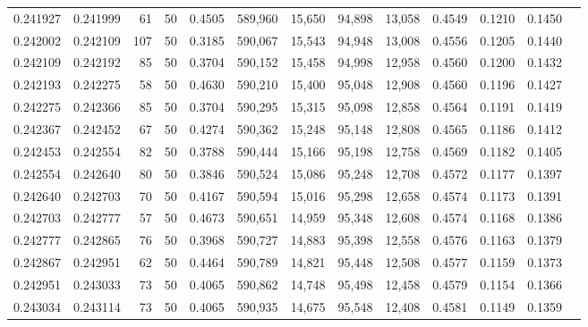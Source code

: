 \begin{tabular}{rrrrrrrrrrrrr}
0.241927 & 0.241999 &    61 &  50 &                                     0.4505 & 589,960 &  15,650 &  94,898 &  13,058 & 0.4549 & 0.1210 & 0.1450 \\
0.242002 & 0.242109 &   107 &  50 &                                     0.3185 & 590,067 &  15,543 &  94,948 &  13,008 & 0.4556 & 0.1205 & 0.1440 \\
0.242109 & 0.242192 &    85 &  50 &                                     0.3704 & 590,152 &  15,458 &  94,998 &  12,958 & 0.4560 & 0.1200 & 0.1432 \\
0.242193 & 0.242275 &    58 &  50 &                                     0.4630 & 590,210 &  15,400 &  95,048 &  12,908 & 0.4560 & 0.1196 & 0.1427 \\
0.242275 & 0.242366 &    85 &  50 &                                     0.3704 & 590,295 &  15,315 &  95,098 &  12,858 & 0.4564 & 0.1191 & 0.1419 \\
0.242367 & 0.242452 &    67 &  50 &                                     0.4274 & 590,362 &  15,248 &  95,148 &  12,808 & 0.4565 & 0.1186 & 0.1412 \\
0.242453 & 0.242554 &    82 &  50 &                                     0.3788 & 590,444 &  15,166 &  95,198 &  12,758 & 0.4569 & 0.1182 & 0.1405 \\
0.242554 & 0.242640 &    80 &  50 &                                     0.3846 & 590,524 &  15,086 &  95,248 &  12,708 & 0.4572 & 0.1177 & 0.1397 \\
0.242640 & 0.242703 &    70 &  50 &                                     0.4167 & 590,594 &  15,016 &  95,298 &  12,658 & 0.4574 & 0.1173 & 0.1391 \\
0.242703 & 0.242777 &    57 &  50 &                                     0.4673 & 590,651 &  14,959 &  95,348 &  12,608 & 0.4574 & 0.1168 & 0.1386 \\
0.242777 & 0.242865 &    76 &  50 &                                     0.3968 & 590,727 &  14,883 &  95,398 &  12,558 & 0.4576 & 0.1163 & 0.1379 \\
0.242867 & 0.242951 &    62 &  50 &                                     0.4464 & 590,789 &  14,821 &  95,448 &  12,508 & 0.4577 & 0.1159 & 0.1373 \\
0.242951 & 0.243033 &    73 &  50 &                                     0.4065 & 590,862 &  14,748 &  95,498 &  12,458 & 0.4579 & 0.1154 & 0.1366 \\
0.243034 & 0.243114 &    73 &  50 &                                     0.4065 & 590,935 &  14,675 &  95,548 &  12,408 & 0.4581 & 0.1149 & 0.1359 \\

\end{tabular}

